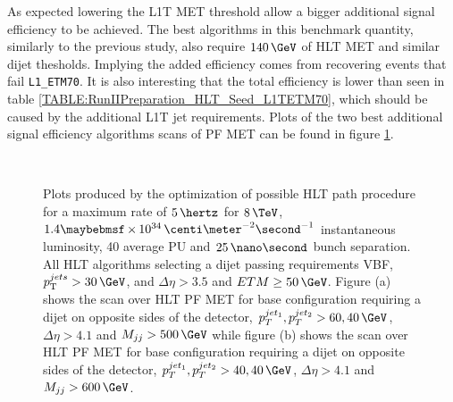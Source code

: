 As expected lowering the \gls{L1T} \gls{MET} threshold allow a bigger additional signal efficiency to be achieved. The best algorithms in this benchmark quantity, similarly to the previous study, also require $140\,\GeV$ of \gls{HLT} \gls{MET} and similar dijet thesholds. Implying the added efficiency comes from recovering events that fail \verb|L1_ETM70|. It is also interesting that the total efficiency is lower than seen in table \ref{TABLE:RunIIPreparation_HLT_Seed_L1TETM70}, which should be caused by the additional \gls{L1T} jet requirements. Plots of the two best additional signal efficiency algorithms scans of \gls{PF} \gls{MET} can be found in figure \ref{FIGURE:RunIIPreparation_HLT_Seed_L1TDijetMET}.

\begin{figure}[!htp]%
\qquad
{}\\
\caption{Plots produced by the optimization of possible \gls{HLT} path procedure for a maximum rate of $5\,\hertz$ for $8\,\TeV$, $1.4 \times 10^{34}\,\centi\meter^{-2}\second^{-1}$ instantaneous luminosity, 40 average \gls{PU} and $25\,\nano\second$ bunch separation. All \gls{HLT} algorithms selecting a dijet passing requirements \gls{VBF}, $\pt^{jets}>30\,\GeV$, and $\Delta\eta>3.5$ and $ETM \geq 50\,\GeV$. Figure (a) shows the scan over \gls{HLT} \gls{PF} \gls{MET} for base configuration requiring a dijet on opposite sides of the detector, $p_T^{jet_1},p_T^{jet_2}>60,40\,\GeV$, $\Delta\eta>4.1$ and $M_{jj}>500\,\GeV$ while figure (b) shows the scan over \gls{HLT} \gls{PF} \gls{MET} for base configuration requiring a dijet on opposite sides of the detector, $p_T^{jet_1},p_T^{jet_2}>40,40\,\GeV$, $\Delta\eta>4.1$ and $M_{jj}>600\,\GeV$.}
\label{FIGURE:RunIIPreparation_HLT_Seed_L1TDijetMET}
\end{figure}

